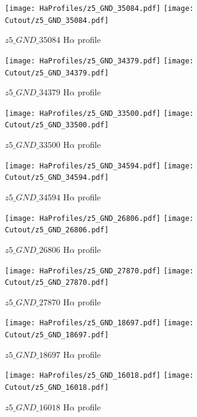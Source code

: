 \documentclass[12pt,english]{article}
\begin{document}
\clearpage
\begin{figure}
\begin{center}\texttt{[image: HaProfiles/z5\_GND\_35084.pdf]}
\texttt{[image: Cutout/z5\_GND\_35084.pdf]}
\caption{$z5\_GND\_35084$ H$\alpha$ profile}
\end{center}
\end{figure}
\clearpage
\begin{figure}
\begin{center}\texttt{[image: HaProfiles/z5\_GND\_34379.pdf]}
\texttt{[image: Cutout/z5\_GND\_34379.pdf]}
\caption{$z5\_GND\_34379$ H$\alpha$ profile}
\end{center}
\end{figure}
\clearpage
\begin{figure}
\begin{center}\texttt{[image: HaProfiles/z5\_GND\_33500.pdf]}
\texttt{[image: Cutout/z5\_GND\_33500.pdf]}
\caption{$z5\_GND\_33500$ H$\alpha$ profile}
\end{center}
\end{figure}
\clearpage
\begin{figure}
\begin{center}\texttt{[image: HaProfiles/z5\_GND\_34594.pdf]}
\texttt{[image: Cutout/z5\_GND\_34594.pdf]}
\caption{$z5\_GND\_34594$ H$\alpha$ profile}
\end{center}
\end{figure}
\clearpage
\begin{figure}
\begin{center}\texttt{[image: HaProfiles/z5\_GND\_26806.pdf]}
\texttt{[image: Cutout/z5\_GND\_26806.pdf]}
\caption{$z5\_GND\_26806$ H$\alpha$ profile}
\end{center}
\end{figure}
\clearpage
\begin{figure}
\begin{center}\texttt{[image: HaProfiles/z5\_GND\_27870.pdf]}
\texttt{[image: Cutout/z5\_GND\_27870.pdf]}
\caption{$z5\_GND\_27870$ H$\alpha$ profile}
\end{center}
\end{figure}
\clearpage
\begin{figure}
\begin{center}\texttt{[image: HaProfiles/z5\_GND\_18697.pdf]}
\texttt{[image: Cutout/z5\_GND\_18697.pdf]}
\caption{$z5\_GND\_18697$ H$\alpha$ profile}
\end{center}
\end{figure}
\clearpage
\begin{figure}
\begin{center}\texttt{[image: HaProfiles/z5\_GND\_16018.pdf]}
\texttt{[image: Cutout/z5\_GND\_16018.pdf]}
\caption{$z5\_GND\_16018$ H$\alpha$ profile}
\end{center}
\end{figure}
\end{document}
